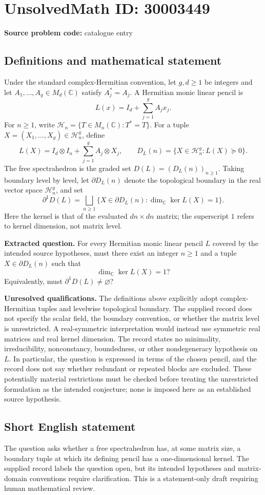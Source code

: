 \documentclass[11pt]{article}
\newcommand{\C}{\mathbb{C}}
\begin{document}
\section*{UnsolvedMath ID: 30003449}
\textbf{Source problem code:} catalogue entry
\subsection{Definitions and mathematical statement}
Under the standard complex-Hermitian convention, let \(g,d\geq 1\) be integers and let \(A_1,\ldots,A_g\in M_d(\C)\) satisfy \(A_j^*=A_j\). A Hermitian monic linear pencil is
\[
L(x)=I_d+\sum_{j=1}^g A_jx_j.
\]
For \(n\geq 1\), write \(\mathcal H_n=\{T\in M_n(\C):T^*=T\}\). For a tuple \(X=(X_1,\ldots,X_g)\in\mathcal H_n^g\), define
\[
L(X)=I_d\otimes I_n+\sum_{j=1}^g A_j\otimes X_j,
\qquad
D_L(n)=\{X\in\mathcal H_n^g:L(X)\succeq0\}.
\]
The free spectrahedron is the graded set \(D(L)=(D_L(n))_{n\geq1}\). Taking boundary level by level, let \(\partial D_L(n)\) denote the topological boundary in the real vector space \(\mathcal H_n^g\), and set
\[
\partial^1D(L)=\bigsqcup_{n\geq1}
\{X\in\partial D_L(n):\dim_{\C}\ker L(X)=1\}.
\]
Here the kernel is that of the evaluated \(dn\times dn\) matrix; the superscript \(1\) refers to kernel dimension, not matrix level.

\textbf{Extracted question.} For every Hermitian monic linear pencil \(L\) covered by the intended source hypotheses, must there exist an integer \(n\geq1\) and a tuple \(X\in\partial D_L(n)\) such that
\[
\dim_{\C}\ker L(X)=1?
\]
Equivalently, must \(\partial^1D(L)\neq\varnothing\)?

\textbf{Unresolved qualifications.} The definitions above explicitly adopt complex-Hermitian tuples and levelwise topological boundary. The supplied record does not specify the scalar field, the boundary convention, or whether the matrix level is unrestricted. A real-symmetric interpretation would instead use symmetric real matrices and real kernel dimension. The record states no minimality, irreducibility, nonconstancy, boundedness, or other nondegeneracy hypothesis on \(L\). In particular, the question is expressed in terms of the chosen pencil, and the record does not say whether redundant or repeated blocks are excluded. These potentially material restrictions must be checked before treating the unrestricted formulation as the intended conjecture; none is imposed here as an established source hypothesis.
\subsection{Short English statement}
The question asks whether a free spectrahedron has, at some matrix size, a boundary tuple at which its defining pencil has a one-dimensional kernel. The supplied record labels the question open, but its intended hypotheses and matrix-domain conventions require clarification. This is a statement-only draft requiring human mathematical review.
\end{document}

